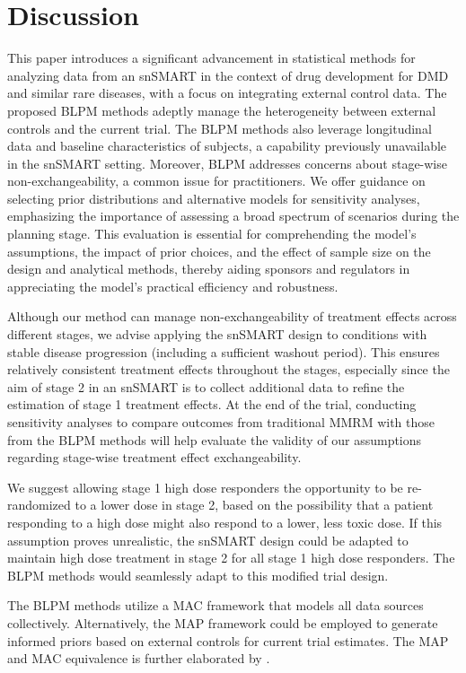 \section{Discussion}
\label{sec:discussion_longitudinal}
This paper introduces a significant advancement in statistical methods for analyzing data from an \ac{snSMART} in the context of drug development for \ac{DMD} and similar rare diseases, with a focus on integrating external control data. The proposed \ac{BLPM} methods adeptly manage the heterogeneity between external controls and the current trial. The \ac{BLPM} methods also leverage longitudinal data and baseline characteristics of subjects, a capability previously unavailable in the \ac{snSMART} setting. Moreover, \ac{BLPM} addresses concerns about stage-wise non-exchangeability, a common issue for practitioners. We offer guidance on selecting prior distributions and alternative models for sensitivity analyses, emphasizing the importance of assessing a broad spectrum of scenarios during the planning stage. This evaluation is essential for comprehending the model's assumptions, the impact of prior choices, and the effect of sample size on the design and analytical methods, thereby aiding sponsors and regulators in appreciating the model's practical efficiency and robustness.

Although our method can manage non-exchangeability of treatment effects across different stages, we advise applying the \ac{snSMART} design to conditions with stable disease progression (including a sufficient washout period). This ensures relatively consistent treatment effects throughout the stages, especially since the aim of stage 2 in an \ac{snSMART} is to collect additional data to refine the estimation of stage 1 treatment effects. At the end of the trial, conducting sensitivity analyses to compare outcomes from traditional \ac{MMRM} with those from the \ac{BLPM} methods will help evaluate the validity of our assumptions regarding stage-wise treatment effect exchangeability.

We suggest allowing stage 1 high dose responders the opportunity to be re-randomized to a lower dose in stage 2, based on the possibility that a patient responding to a high dose might also respond to a lower, less toxic dose. If this assumption proves unrealistic, the \ac{snSMART} design could be adapted to maintain high dose treatment in stage 2 for all stage 1 high dose responders. The \ac{BLPM} methods would seamlessly adapt to this modified trial design.

The \ac{BLPM} methods utilize a \ac{MAC} framework that models all data sources collectively. Alternatively, the \ac{MAP} framework could be employed to generate informed priors based on external controls for current trial estimates. The \ac{MAP} and \ac{MAC} equivalence is further elaborated by \cite{schmidli2014robust}.

